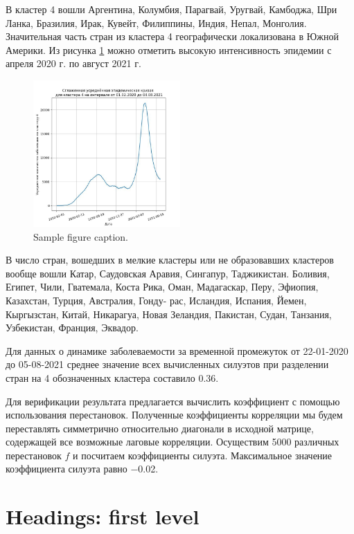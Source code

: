 \documentclass{article}
\begin{document}
В кластер 4 вошли Аргентина, Колумбия, Парагвай, Уругвай, Камбоджа, Шри Ланка, Бразилия, Ирак, Кувейт, Филиппины, Индия, Непал, Монголия. Значительная часть стран из кластера 4 географически локализована в Южной Америки. Из рисунка \ref{fig:fig4} можно отметить высокую интенсивность эпидемии с апреля 2020 г. по август 2021 г.

\begin{figure}
	\centering
	\includegraphics[width=0.5\textwidth]{../figures/clasters4.jpg}
	\caption{Sample figure caption.}
	\label{fig:fig4}
\end{figure}

В число стран, вошедших в мелкие кластеры или не образовавших кластеров вообще вошли Катар, Саудовская Аравия, Сингапур, Таджикистан. Боливия, Египет, Чили, Гватемала, Коста Рика, Оман, Мадагаскар, Перу, Эфиопия, Казахстан, Турция, Австралия, Гонду-
рас, Исландия, Испания, Йемен, Кыргызстан, Китай, Никарагуа, Новая Зеландия, Пакистан, Судан, Танзания, Узбекистан, Франция, Эквадор.

Для данных о динамике заболеваемости за временной промежуток от 22-01-2020 до 05-08-2021 среднее значение всех вычисленных силуэтов при разделении стран на 4 обозначенных
кластера составило 0.36.

Для верификации результата предлагается вычислить коэффициент с помощью использования перестановок. Полученные коэффициенты корреляции мы будем переставлять симметрично относительно диагонали в исходной матрице, содержащей все возможные лаговые корреляции. Осуществим 5000 различных перестановок $f$ и посчитаем коэффициенты силуэта. Максимальное значение коэффициента силуэта равно −0.02.




\section{Headings: first level}
\label{sec:headings}
\end{document}
